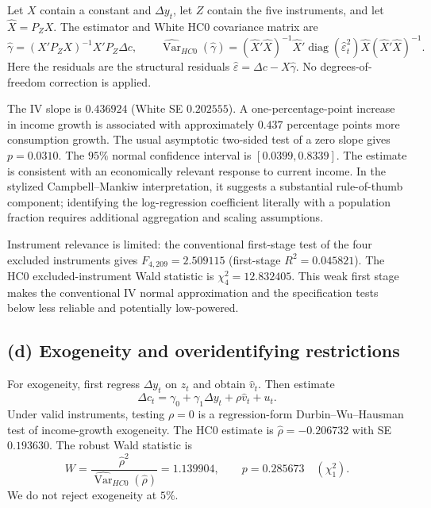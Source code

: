 Let $X$ contain a constant and $\Delta y_t$, let $Z$ contain the five
instruments, and let $\widehat X=P_ZX$.
The estimator and White HC0 covariance matrix are
\[
\widehat\gamma=(X'P_ZX)^{-1}X'P_Z\Delta c,\qquad
\widehat{\operatorname{Var}}_{HC0}(\widehat\gamma)
=(\widehat X'\widehat X)^{-1}
\widehat X'\operatorname{diag}(\widehat\varepsilon_t^2)\widehat X
(\widehat X'\widehat X)^{-1}.
\]
Here the residuals are the structural residuals
$\widehat\varepsilon=\Delta c-X\widehat\gamma$.
No degrees-of-freedom correction is applied.
\begin{table}[H]
\centering
\caption{Consumption growth on current income growth, $n=214$}
\label{tab:iv}

\end{table}
The IV slope is $0.436924$ (White SE $0.202555$).
A one-percentage-point increase in income growth is associated with
approximately $0.437$ percentage points more consumption growth.
The usual asymptotic two-sided test of a zero slope gives $p=0.0310$.
The $95\%$ normal confidence interval is $[0.0399,0.8339]$.
The estimate is consistent with an economically relevant response
to current income. In the stylized Campbell--Mankiw interpretation,
it suggests a substantial rule-of-thumb component; identifying the
log-regression coefficient literally with a population fraction requires
additional aggregation and scaling assumptions.

Instrument relevance is limited: the conventional first-stage test
of the four excluded instruments gives $F_{4,209}=2.509115$
(first-stage $R^2=0.045821$).
The HC0 excluded-instrument Wald statistic is $\chi^2_4=12.832405$.
This weak first stage makes the conventional IV normal approximation
and the specification tests below less reliable and potentially low-powered.

\clearpage
\subsection*{(d) Exogeneity and overidentifying restrictions}
For exogeneity, first regress $\Delta y_t$ on $z_t$ and obtain
$\widehat v_t$. Then estimate
\[
\Delta c_t=\gamma_0+\gamma_1\Delta y_t+\rho\widehat v_t+u_t.
\]
Under valid instruments, testing $\rho=0$ is a regression-form
Durbin--Wu--Hausman test of income-growth exogeneity.
The HC0 estimate is $\widehat\rho=-0.206732$ with SE $0.193630$.
The robust Wald statistic is
\[
W=\frac{\widehat\rho^2}{\widehat{\operatorname{Var}}_{HC0}(\widehat\rho)}
=1.139904,\qquad p=0.285673\quad(\chi^2_1).
\]
We do not reject exogeneity at $5\%$.

